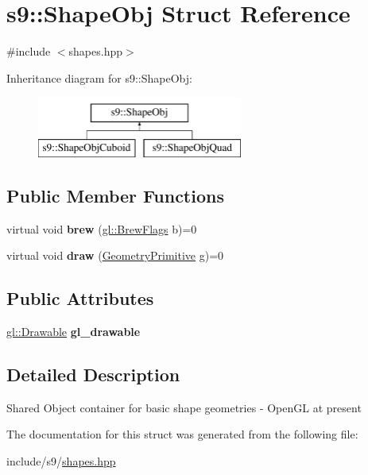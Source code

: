 \hypertarget{structs9_1_1ShapeObj}{\section{s9\-:\-:\-Shape\-Obj \-Struct \-Reference}
\label{structs9_1_1ShapeObj}
}


{\ttfamily \#include $<$shapes.\-hpp$>$}

\-Inheritance diagram for s9\-:\-:\-Shape\-Obj\-:\begin{figure}[H]
\begin{center}
\leavevmode
\includegraphics[height=2.000000cm]{structs9_1_1ShapeObj}
\end{center}
\end{figure}
\subsection*{\-Public \-Member \-Functions}
\begin{DoxyCompactItemize}
\item 
\hypertarget{structs9_1_1ShapeObj_aed1b4221696bfd60d22eeda7ddaf7d5f}{virtual void {\bfseries brew} (\hyperlink{structs9_1_1gl_1_1BrewFlags}{gl\-::\-Brew\-Flags} b)=0}\label{structs9_1_1ShapeObj_aed1b4221696bfd60d22eeda7ddaf7d5f}

\item 
\hypertarget{structs9_1_1ShapeObj_a8bba4a53945515203ade6683e5f1f8a6}{virtual void {\bfseries draw} (\hyperlink{namespaces9_ad57d1332f8fd67d23f6a1d3520ab785c}{\-Geometry\-Primitive} g)=0}\label{structs9_1_1ShapeObj_a8bba4a53945515203ade6683e5f1f8a6}

\end{DoxyCompactItemize}
\subsection*{\-Public \-Attributes}
\begin{DoxyCompactItemize}
\item 
\hypertarget{structs9_1_1ShapeObj_a5d118dcbb724b552f9e1038d67a8deef}{\hyperlink{classs9_1_1gl_1_1Drawable}{gl\-::\-Drawable} {\bfseries gl\-\_\-drawable}}\label{structs9_1_1ShapeObj_a5d118dcbb724b552f9e1038d67a8deef}

\end{DoxyCompactItemize}


\subsection{\-Detailed \-Description}
\-Shared \-Object container for basic shape geometries -\/ \-Open\-G\-L at present 

\-The documentation for this struct was generated from the following file\-:\begin{DoxyCompactItemize}
\item 
include/s9/\hyperlink{shapes_8hpp}{shapes.\-hpp}\end{DoxyCompactItemize}
